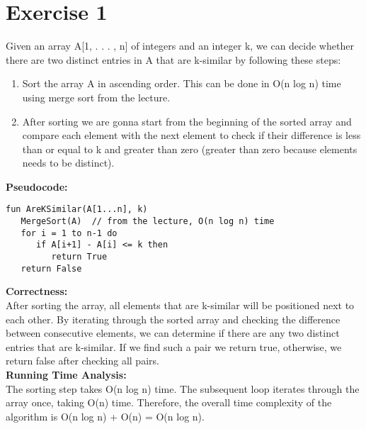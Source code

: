 \documentclass{article}
\begin{document}

\section*{Exercise 1}
Given an array A[1, . . . , n] of integers and an integer k, we can decide whether there are two distinct entries in A that are k-similar by following these steps:
\begin{enumerate}
    \item Sort the array A in ascending order. This can be done in O(n log n) time using merge sort from the lecture.
    \item After sorting we are gonna start from the beginning of the sorted array and compare each element with the next element to check if their difference is less than or equal to k and greater than zero (greater than zero because elements needs to be distinct).
\end{enumerate}
\textbf{Pseudocode:}\\
\begin{verbatim}
fun AreKSimilar(A[1...n], k)
   MergeSort(A)  // from the lecture, O(n log n) time
   for i = 1 to n-1 do
      if A[i+1] - A[i] <= k then
         return True
   return False
\end{verbatim}
\textbf{Correctness:}\\
After sorting the array, all elements that are k-similar will be positioned next to each other. By iterating through the sorted array and checking the difference between consecutive elements, we can determine if there are any two distinct entries that are k-similar. If we find such a pair we return true, otherwise, we return false after checking all pairs.\\
\textbf{Running Time Analysis:}\\
The sorting step takes O(n log n) time. The subsequent loop iterates through the array once, taking O(n) time. Therefore, the overall time complexity of the algorithm is O(n log n) + O(n) = O(n log n).
\end{document}
